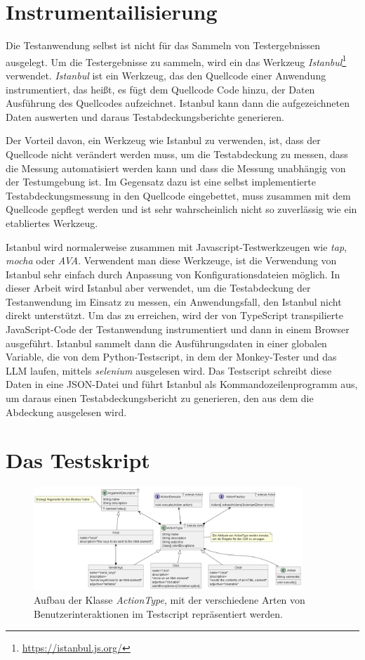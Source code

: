 \section{Instrumentailisierung}

Die Testanwendung selbst ist nicht für das Sammeln von Testergebnissen ausgelegt.
Um die Testergebnisse zu sammeln, wird ein das Werkzeug \textit{Istanbul}\footnote{\url{https://istanbul.js.org/}} verwendet.
\textit{Istanbul} ist ein Werkzeug, das den Quellcode einer Anwendung instrumentiert, das heißt, es fügt dem Quellcode Code hinzu, der Daten Ausführung des Quellcodes aufzeichnet.
Istanbul kann dann die aufgezeichneten Daten auswerten und daraus Testabdeckungsberichte generieren.

Der Vorteil davon, ein Werkzeug wie Istanbul zu verwenden, ist, dass der Quellcode nicht verändert werden muss, um die Testabdeckung zu messen, dass die Messung automatisiert werden kann und dass die Messung unabhängig von der Testumgebung ist.
Im Gegensatz dazu ist eine selbst implementierte Testabdeckungsmessung in den Quellcode eingebettet, muss zusammen mit dem Quellcode gepflegt werden und ist sehr wahrscheinlich nicht so zuverlässig wie ein etabliertes Werkzeug.

Istanbul wird normalerweise zusammen mit Javascript-Testwerkzeugen wie \textit{tap}, \textit{mocha} oder \textit{AVA}.
Verwendent man diese Werkzeuge, ist die Verwendung von Istanbul sehr einfach durch Anpassung von Konfigurationsdateien möglich.
In dieser Arbeit wird Istanbul aber verwendet, um die Testabdeckung der Testanwendung im Einsatz zu messen, ein Anwendungsfall, den Istanbul nicht direkt unterstützt.
Um das zu erreichen, wird der von TypeScript transpilierte JavaScript-Code der Testanwendung instrumentiert und dann in einem Browser ausgeführt.
Istanbul sammelt dann die Ausführungsdaten in einer globalen Variable, die von dem Python-Testscript, in dem der Monkey-Tester und das LLM laufen, mittels \textit{selenium} ausgelesen wird.
Das Testscript schreibt diese Daten in eine JSON-Datei und führt Istanbul als Kommandozeilenprogramm aus, um daraus einen Testabdeckungsbericht zu generieren, den aus dem die Abdeckung ausgelesen wird.

\section{Das Testskript}

\begin{figure}
    \centering
    \includegraphics[width=0.9\textwidth]{plantuml/ActionType.png}
    \caption{Aufbau der Klasse \textit{ActionType}, mit der verschiedene Arten von Benutzerinteraktionen im Testscript repräsentiert werden.}
    \label{fig:actiontype}
\end{figure}

